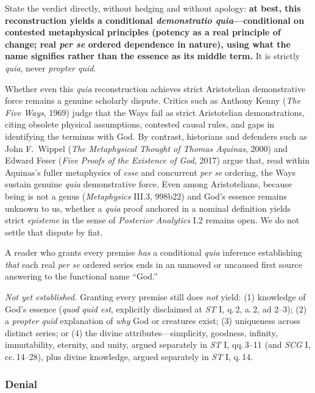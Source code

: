 State the verdict directly, without hedging and without apology: \textbf{at best, this reconstruction yields a conditional \emph{demonstratio quia}---conditional on contested metaphysical principles (potency as a real principle of change; real \emph{per se} ordered dependence in nature), using what the name signifies rather than the essence as its middle term.} It is strictly \emph{quia}, never \emph{propter quid}.

Whether even this \emph{quia} reconstruction achieves strict Aristotelian demonstrative force remains a genuine scholarly dispute. Critics such as Anthony Kenny (\emph{The Five Ways}, 1969) judge that the Ways fail as strict Aristotelian demonstrations, citing obsolete physical assumptions, contested causal rules, and gaps in identifying the terminus with God. By contrast, historians and defenders such as John F.\ Wippel (\emph{The Metaphysical Thought of Thomas Aquinas}, 2000) and Edward Feser (\emph{Five Proofs of the Existence of God}, 2017) argue that, read within Aquinas's fuller metaphysics of \emph{esse} and concurrent \emph{per se} ordering, the Ways sustain genuine \emph{quia} demonstrative force. Even among Aristotelians, because being is not a genus (\emph{Metaphysics} III.3, 998b22) and God's essence remains unknown to us, whether a \emph{quia} proof anchored in a nominal definition yields strict \emph{episteme} in the sense of \emph{Posterior Analytics} I.2 remains open. We do not settle that dispute by fiat.

A reader who grants every premise \emph{has} a conditional \emph{quia} inference establishing \emph{that} each real \emph{per se} ordered series ends in an unmoved or uncaused first source answering to the functional name ``God.''

\emph{Not yet established.} Granting every premise still does \emph{not} yield: (1) knowledge of God's essence (\emph{quod quid est}, explicitly disclaimed at \emph{ST} I, q.\,2, a.\,2, ad 2--3); (2) a \emph{propter quid} explanation of \emph{why} God or creatures exist; (3) uniqueness across distinct series; or (4) the divine attributes---simplicity, goodness, infinity, immutability, eternity, and unity, argued separately in \emph{ST} I, qq.\,3--11 (and \emph{SCG} I, cc.\,14--28), plus divine knowledge, argued separately in \emph{ST} I, q.\,14.

\subsubsection*{Denial}

